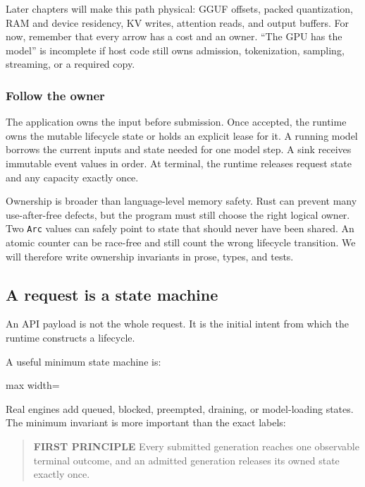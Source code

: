 \documentclass[
  10pt,
]{article}
\begin{document}
Later chapters will make this path physical: GGUF offsets, packed
quantization, RAM and device residency, KV writes, attention reads, and
output buffers. For now, remember that every arrow has a cost and an
owner. ``The GPU has the model'' is incomplete if host code still owns
admission, tokenization, sampling, streaming, or a required copy.

\subsubsection{Follow the owner}\label{follow-the-owner}

The application owns the input before submission. Once accepted, the
runtime owns the mutable lifecycle state or holds an explicit lease for
it. A running model borrows the current inputs and state needed for one
model step. A sink receives immutable event values in order. At
terminal, the runtime releases request state and any capacity exactly
once.

Ownership is broader than language-level memory safety. Rust can prevent
many use-after-free defects, but the program must still choose the right
logical owner. Two \texttt{Arc} values can safely point to state that
should never have been shared. An atomic counter can be race-free and
still count the wrong lifecycle transition. We will therefore write
ownership invariants in prose, types, and tests.

\subsection{A request is a state
machine}\label{a-request-is-a-state-machine}

An API payload is not the whole request. It is the initial intent from
which the runtime constructs a lifecycle.

A useful minimum state machine is:

\begin{center}\begin{adjustbox}{max width=\linewidth}\end{adjustbox}\end{center}

Real engines add queued, blocked, preempted, draining, or model-loading
states. The minimum invariant is more important than the exact labels:

\begin{quote}
\textbf{FIRST PRINCIPLE} Every submitted generation reaches one
observable terminal outcome, and an admitted generation releases its
owned state exactly once.
\end{quote}
\end{document}
